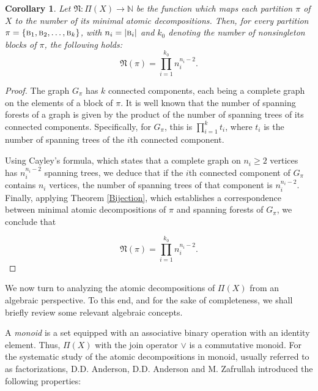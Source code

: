 \documentclass[12pt]{extarticle}
\newtheorem{Corollary}{Corollary}
\begin{document}
	\begin{Corollary} Let $\mathfrak{N}:\Pi(X)\rightarrow\mathbb{N}$ be the function which maps each partition $\pi$ of $X$ to the number of its minimal atomic decompositions. Then, for every partition $\pi = \{\textsc{b}_1, \textsc{b}_2, \ldots, \textsc{b}_k\}$, with $n_i=|\textsc{b}_i|$ and $k_0$ denoting the number of nonsingleton blocks of $\pi$, the following holds:
		\begin{equation}\label{formula}
		\mathfrak{N}(\pi)=\prod_{i=1}^{k_0} n_i^{n_i-2}.
		\end{equation} 
	\end{Corollary}
	\begin{proof}
		The graph $G_{\pi}$ has $k$ connected components, each being a complete graph on the elements of a block of $\pi$. It is well known that the number of spanning forests of a graph is given by the product of the number of spanning trees of its connected components. Specifically, for $G_{\pi}$, this is $\prod_{i=1}^k t_i$, 
		where $t_i$ is the number of spanning trees of the $i$th connected component.
		
		Using Cayley's formula, which states that a complete graph on $n_i\geq2$ vertices has $n_i^{n_i - 2}$ spanning trees, we deduce that if the $i$th connected component of $G_{\pi}$ contains $n_i$ vertices, the number of spanning trees of that component is $n_i^{n_i - 2}$. Finally, applying Theorem \ref{Bijection}, which establishes a correspondence between minimal atomic decompositions of $\pi$ and spanning forests of $G_{\pi}$, we conclude that	
		
		\begin{equation}
		\mathfrak{N}(\pi)=\prod_{i=1}^{k_0} n_i^{n_i-2}.
		\end{equation}
	\end{proof}

We now turn to analyzing the atomic decompositions of $\Pi(X)$ from an algebraic perspective. To this end, and for the sake of completeness, we shall briefly review some relevant algebraic concepts.

A \emph{monoid} is a set equipped with an associative binary operation with an identity element.  Thus, $\Pi(X)$ with the join operator $\vee$ is a commutative monoid. For the systematic study of the  atomic decompositions in monoid, usually referred to as factorizations, D.D. Anderson, D.D. Anderson and M. Zafrullah introduced the following properties:
\end{document}
